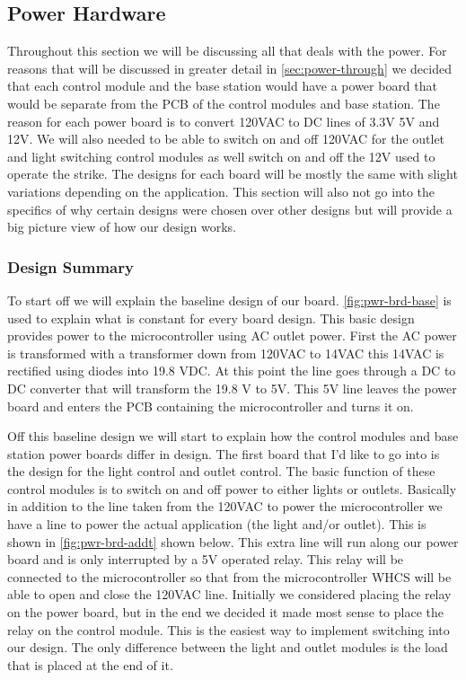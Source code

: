 \subsection{Power Hardware}
\label{sec:power-hw}

Throughout this section we will be discussing all that deals with the
power. For reasons that will be discussed in greater detail in
\autoref{sec:power-through} we decided that each control module and the base
station would have a power board that would be separate from the PCB of the
control modules and base station. The reason for each power board is to convert
120VAC to DC lines of 3.3V 5V and 12V. We will also needed to be able to switch
on and off 120VAC for the outlet and light switching control modules as well
switch on and off the 12V used to operate the strike. The designs for each
board will be mostly the same with slight variations depending on the
application. This section will also not go into the
specifics of why certain designs were chosen over other designs but will
provide a big picture view of how our design works.

\subsubsection{Design Summary}

To start off we will explain the baseline design of our board.
\autoref{fig:pwr-brd-base} is used to explain what is constant for every board design. This
basic design provides power to the microcontroller using AC outlet power. First
the AC power is transformed with a transformer down from 120VAC to 14VAC this
14VAC is rectified using diodes into 19.8 VDC. At this point the line goes
through a DC to DC converter that will transform the 19.8 V to 5V. This 5V line
leaves the power board and enters the PCB containing the microcontroller and
turns it on.


Off this baseline design we will start to explain how the
control modules and base station power boards differ in design. The first
board that I{}'d like to go into is the design for the light control and
outlet control. The basic function of these control modules is to switch on
and off power to either lights or outlets. Basically in addition to the line
taken from the 120VAC to power the microcontroller we have a line to
power the actual application (the light and/or outlet). This is shown in
\autoref{fig:pwr-brd-addt} shown below. This extra line will run along our
power board and is only interrupted by a 5V operated relay. This relay
will be connected to the microcontroller so that from the microcontroller
WHCS will be able to open and close the 120VAC line. Initially we considered placing the relay on the power board, but in the end we decided it made most sense to place the relay on the control module. This is the easiest way
to implement switching into our design. The only difference between the light
and outlet modules is the load that is placed at the end of it.

